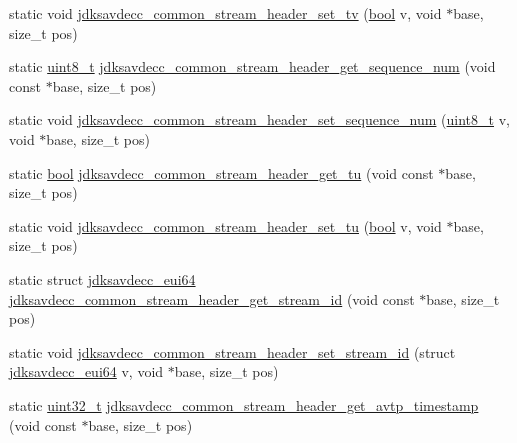 \begin{DoxyCompactItemize}
static void \hyperlink{group__jdksavdecc__avtp__common__stream__header_ga2a32f9c323ea9356237fabd343faf20f}{jdksavdecc\+\_\+common\+\_\+stream\+\_\+header\+\_\+set\+\_\+tv} (\hyperlink{avb__gptp_8h_af6a258d8f3ee5206d682d799316314b1}{bool} v, void $\ast$base, size\+\_\+t pos)
\item 
static \hyperlink{stdint_8h_aba7bc1797add20fe3efdf37ced1182c5}{uint8\+\_\+t} \hyperlink{group__jdksavdecc__avtp__common__stream__header_gadaa25243226bcdb06fecd9aa768d24fb}{jdksavdecc\+\_\+common\+\_\+stream\+\_\+header\+\_\+get\+\_\+sequence\+\_\+num} (void const $\ast$base, size\+\_\+t pos)
\item 
static void \hyperlink{group__jdksavdecc__avtp__common__stream__header_gae7ff0f127b7288d0498f2e094ebea4f0}{jdksavdecc\+\_\+common\+\_\+stream\+\_\+header\+\_\+set\+\_\+sequence\+\_\+num} (\hyperlink{stdint_8h_aba7bc1797add20fe3efdf37ced1182c5}{uint8\+\_\+t} v, void $\ast$base, size\+\_\+t pos)
\item 
static \hyperlink{avb__gptp_8h_af6a258d8f3ee5206d682d799316314b1}{bool} \hyperlink{group__jdksavdecc__avtp__common__stream__header_ga7ca83d1f9672ca4f055f9020712e47c0}{jdksavdecc\+\_\+common\+\_\+stream\+\_\+header\+\_\+get\+\_\+tu} (void const $\ast$base, size\+\_\+t pos)
\item 
static void \hyperlink{group__jdksavdecc__avtp__common__stream__header_ga55f34eac18b6a9c61f51ec4ea52bc50e}{jdksavdecc\+\_\+common\+\_\+stream\+\_\+header\+\_\+set\+\_\+tu} (\hyperlink{avb__gptp_8h_af6a258d8f3ee5206d682d799316314b1}{bool} v, void $\ast$base, size\+\_\+t pos)
\item 
static struct \hyperlink{structjdksavdecc__eui64}{jdksavdecc\+\_\+eui64} \hyperlink{group__jdksavdecc__avtp__common__stream__header_gaaeb4237cce0457e51e4ca3b39ef4441c}{jdksavdecc\+\_\+common\+\_\+stream\+\_\+header\+\_\+get\+\_\+stream\+\_\+id} (void const $\ast$base, size\+\_\+t pos)
\item 
static void \hyperlink{group__jdksavdecc__avtp__common__stream__header_ga3becca2227289601d28576e0d592c5d0}{jdksavdecc\+\_\+common\+\_\+stream\+\_\+header\+\_\+set\+\_\+stream\+\_\+id} (struct \hyperlink{structjdksavdecc__eui64}{jdksavdecc\+\_\+eui64} v, void $\ast$base, size\+\_\+t pos)
\item 
static \hyperlink{parse_8c_a6eb1e68cc391dd753bc8ce896dbb8315}{uint32\+\_\+t} \hyperlink{group__jdksavdecc__avtp__common__stream__header_gae53726ce341a081a49329cf0381f7700}{jdksavdecc\+\_\+common\+\_\+stream\+\_\+header\+\_\+get\+\_\+avtp\+\_\+timestamp} (void const $\ast$base, size\+\_\+t pos)

\end{DoxyCompactItemize}
